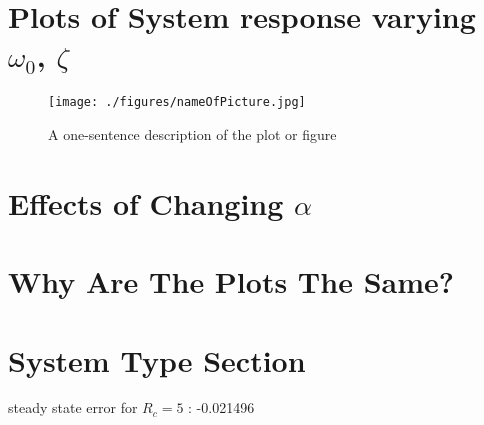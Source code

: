
\section{Plots of System response varying $\omega_{0}$, $\zeta$}
\begin{figure}[H]
	\centering
	\texttt{[image: ./figures/nameOfPicture.jpg]} %
	\caption{A one-sentence description of the plot or figure}
	\label{fig:name} %
\end{figure}
\section{Effects of Changing $\alpha$}

\section{Why Are The Plots The Same?}


\section{System Type Section}


steady state error for $R_{c} = 5$ : -0.021496
